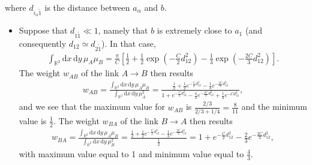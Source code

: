 \documentclass[12pt]{article}
\newcommand{\xd}{\mathrm{d}}
\numberwithin{equation}{section} %
\numberwithin{figure}{section} %
\theoremstyle{definition}
\begin{document}
where $d_{i_{\alpha} \tilde{1}}$ is the distance between $a_{\alpha}$ and $b$.

\begin{itemize}
	\item
Suppose that $d_{1 \tilde{1}} \ll 1$, namely that $b$ is extremely close to $a_1$ (and consequently $d_{12} \simeq d_{2 \tilde{1}}$). In that case,
\begin{align}
\int_{{\mathbb R}^2} \xd x \, \xd y \, \mu_A \mu_B 
= \frac{\pi}{C} \left[  \frac12  + \frac12  \exp \left( - \frac{C}{2} d_{12 }^2 \right)  - \frac{1}{3} \exp \left( -\frac{2C}{3} d_{12}^2 \right)  \right].
\end{align}
The weight $w_{AB}$ of the link $A \rightarrow B$ then results
\begin{align}
w_{AB} = \frac{\int_{{\mathbb R}^2} \xd x \, \xd y \, \mu_A \mu_B}{\int_{{\mathbb R}^2} \xd x \, \xd y \, \mu_A^2} = \frac{ \frac12  + \frac12  e^{ - \frac{C}{2} d_{12 }^2 }  - \frac{1}{3} e^{-\frac{2C}{3} d_{12}^2 } }{ 1+e^{- \frac{C}{2}d^2_{12}} - \frac{4}{3} e^{- \frac{2C}{3} d^2_{1 2} } + \frac{1}{4} e^{- C d_{12}^2 } },%
\end{align}
and we see that the maximum value for $w_{AB}$ is $\frac{2/3}{2/3+1/4} = \frac{8}{11}$ and the minimum value is $\frac12$. The weight $w_{BA}$ of the link $B \rightarrow A$ then results
\begin{align}
w_{BA} = \frac{\int_{{\mathbb R}^2} \xd x \, \xd y \, \mu_A \mu_B}{\int_{{\mathbb R}^2} \xd x \, \xd y \, \mu_B^2} = \frac{ \frac12  + \frac12  e^{ - \frac{C}{2} d_{12 }^2 }  - \frac{1}{3} e^{-\frac{2C}{3} d_{12}^2 } }{ \frac12 } = 1+e^{- \frac{C}{2}d^2_{12}} - \frac{2}{3} e^{- \frac{2C}{3} d^2_{1 2} },%
\end{align}
with maximum value equal to 1 and minimum value equal to $\frac{4}{3}$.
	

\end{itemize}
\end{document}

